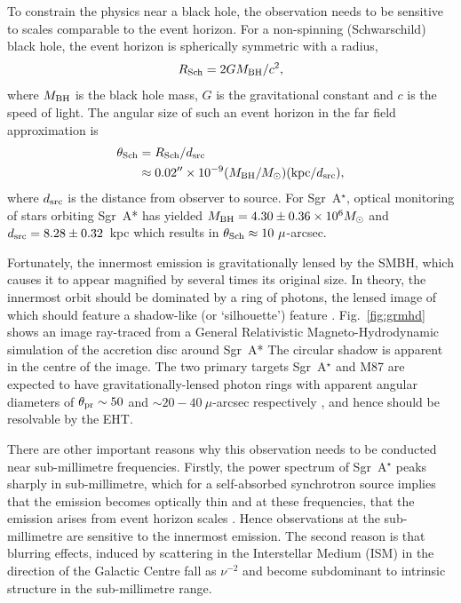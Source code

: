 To constrain the physics near a black hole, the observation needs to be sensitive to scales comparable to the event horizon. For a non-spinning (Schwarschild) black hole, the event horizon is spherically symmetric with a radius, 
\begin{equation}
R_{\rm Sch} = 2 G M_{\rm BH} /c^2,
\end{equation}
where $M_{\rm BH}$ is the black hole mass, $G$ is the gravitational constant and $c$ is the speed of light. The angular size of such an event horizon in the far field approximation is
\begin{align}
\theta_{\rm Sch} &= R_{\rm Sch} / d_{\rm src}\\
&\approx 0.02^{\prime \prime} \times 10^{-9} (M_{\rm BH}/M_\odot)({\rm kpc}/d_{\rm src}),
\end{align}
where $d_{\rm src}$ is the distance from observer to source. For Sgr~A$^\star$, optical monitoring of stars orbiting Sgr~A* \citep{Gillessen_2009} has yielded ${M_{\rm BH} = 4.30 \pm 0.36 \times 10^{6} M_\odot}$ and ${d_{\rm src}= 8.28 \pm 0.32}$~kpc which results in ${\theta_{\rm Sch} \approx 10\ \mu}$-arcsec. 

Fortunately, the innermost emission is gravitationally lensed by the SMBH, which causes it to appear magnified by several times its original size. In theory, the innermost orbit should be dominated by a ring of photons, the lensed image of which should feature a shadow-like (or `silhouette') feature \citep[e.g.][]{Johannsen_2010}. Fig.~\ref{fig:grmhd} shows an image ray-traced from a General Relativistic Magneto-Hydrodynamic simulation of the accretion disc around Sgr~A* \citep{Moscibrodzka_2014} The circular shadow is apparent in the centre of the image. The two primary targets Sgr~A$^\star$ and M87 are expected to have gravitationally-lensed photon rings with apparent angular diameters of $\theta_{\rm pr} \sim 50$ and $\sim 20-40\ \mu$-arcsec respectively \citep*{Broderick_2009,Falcke_2013}, and hence should be resolvable by the EHT. 

There are other important reasons why this observation needs to be conducted near sub-millimetre frequencies. Firstly, the power spectrum of Sgr~A$^\star$ peaks sharply in sub-millimetre, which for a self-absorbed synchrotron source  implies that the emission becomes optically thin and at these frequencies, that the emission arises from event horizon scales \citep{Serabyn_1997,Falcke_1998}. Hence observations at the sub-millimetre are sensitive to the innermost emission.
The second reason is that blurring effects, induced by scattering in the Interstellar Medium (ISM) in the direction of the Galactic Centre \citep[e.g.][]{Fish_2014} fall as $\nu^{-2}$ and become subdominant to intrinsic structure in the sub-millimetre range.


